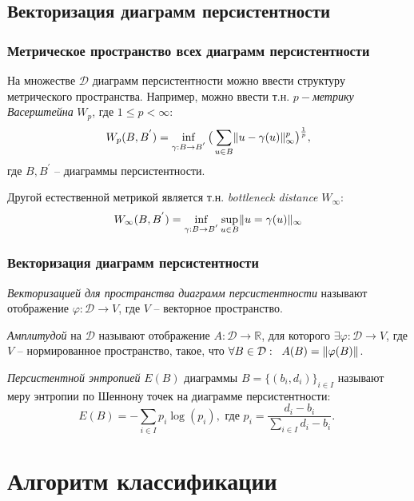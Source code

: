 \documentclass{beamer}
\DeclarePairedDelimiter\norm{\lVert}{\rVert}%
\begin{document}
		\subsection{Векторизация диаграмм персистентности}
		\begin{frame}
			\frametitle{Метрическое пространство всех диаграмм персистентности}
			На множестве $\mathcal{D}$ диаграмм персистентности можно ввести структуру метрического пространства. Например, можно ввести т.н. {\it $p-$метрику Васерштейна} $W_p$, где $1 \leq p < \infty$:
			\[
			W_p(B,B^{'}) = \inf\limits_{\gamma:B\to B^{'}} 
			\big( 
			\sum\limits_{u \in B} \norm{u - \gamma(u)}_\infty^p
			\big) ^{\frac{1}{p}},
			\]
			где $B, B^{'}$ -- диаграммы персистентности. 
			
			Другой естественной метрикой является т.н. {\it bottleneck distance} $W_\infty$:
			\[
				W_\infty(B, B^{'}) = \inf\limits_{\gamma:B\to B^{'}} \sup\limits_{u \in B}
										\norm{u = \gamma(u)}_\infty
			\]
		\end{frame}
		\begin{frame}
			\frametitle{Векторизация диаграмм персистентности}
			{\it Векторизацией для пространства диаграмм персистентности} называют отображение $ \varphi: \mathcal{D} \to V $, где $V$ -- векторное пространство. 
			
			{\it Амплитудой} на $\mathcal{D}$ называют отображение $A: \mathcal{D} \to \mathbb{R}$, для которого $\exists \varphi: \mathcal{D} \to V$, где $V$ -- нормированное пространство, такое, что $ \forall B \in \mathcal{D}: \;\; A(B) = \norm{\varphi(B)}$.
			
			{\it Персистентной энтропией} $E(B)$ диаграммы $B = \{ (b_i, d_i) \}_{i \in I}$ называют меру энтропии по Шеннону точек на диаграмме персистентности:
			\[
				E(B) = - \sum\limits_{i \in I} p_i \log(p_i), \text{ где $p_i = \dfrac{d_i - b_i}{\sum\limits_{i \in I}d_i-b_i}$. }
			\]
		\end{frame}
	
	\section{Алгоритм классификации}
\end{document}
